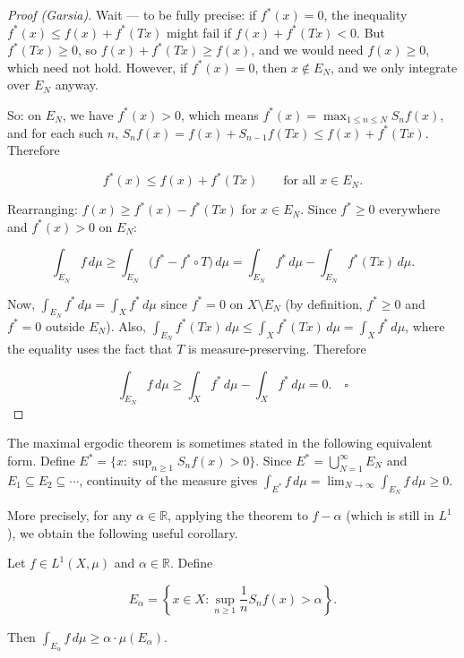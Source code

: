 \begin{proof}[Proof (Garsia)]
Wait --- to be fully precise: if $f^*(x) = 0$, the inequality $f^*(x) \leq f(x) + f^*(Tx)$ might fail if $f(x) + f^*(Tx) < 0$. But $f^*(Tx) \geq 0$, so $f(x) + f^*(Tx) \geq f(x)$, and we would need $f(x) \geq 0$, which need not hold. However, if $f^*(x) = 0$, then $x \notin E_N$, and we only integrate over $E_N$ anyway.

So: on $E_N$, we have $f^*(x) > 0$, which means $f^*(x) = \max_{1 \leq n \leq N} S_n f(x)$, and for each such $n$, $S_n f(x) = f(x) + S_{n-1}f(Tx) \leq f(x) + f^*(Tx)$. Therefore

\[
f^*(x) \leq f(x) + f^*(Tx) \qquad \text{for all } x \in E_N.
\]

Rearranging: $f(x) \geq f^*(x) - f^*(Tx)$ for $x \in E_N$. Since $f^* \geq 0$ everywhere and $f^*(x) > 0$ on $E_N$:

\[
\int_{E_N} f \, d\mu \geq \int_{E_N} \big(f^* - f^* \circ T\big) \, d\mu = \int_{E_N} f^* \, d\mu - \int_{E_N} f^*(Tx) \, d\mu.
\]

Now, $\int_{E_N} f^* \, d\mu = \int_X f^* \, d\mu$ since $f^* = 0$ on $X \setminus E_N$ (by definition, $f^* \geq 0$ and $f^* = 0$ outside $E_N$). Also, $\int_{E_N} f^*(Tx) \, d\mu \leq \int_X f^*(Tx) \, d\mu = \int_X f^* \, d\mu$, where the equality uses the fact that $T$ is measure-preserving. Therefore

\[
\int_{E_N} f \, d\mu \geq \int_X f^* \, d\mu - \int_X f^* \, d\mu = 0. \quad \square
\]

\end{proof}

\begin{remark}
The maximal ergodic theorem is sometimes stated in the following equivalent form. Define $E^* = \{x : \sup_{n \geq 1} S_n f(x) > 0\}$. Since $E^* = \bigcup_{N=1}^\infty E_N$ and $E_1 \subseteq E_2 \subseteq \cdots$, continuity of the measure gives $\int_{E^*} f \, d\mu = \lim_{N \to \infty} \int_{E_N} f \, d\mu \geq 0$.

More precisely, for any $\alpha \in \mathbb{R}$, applying the theorem to $f - \alpha$ (which is still in $L^1$), we obtain the following useful corollary.
\end{remark}


\begin{corollary}\label{cor:9.7}
Let $f \in L^1(X, \mu)$ and $\alpha \in \mathbb{R}$. Define

\[
E_\alpha = \left\{ x \in X : \sup_{n \geq 1} \frac{1}{n} S_n f(x) > \alpha \right\}.
\]

Then $\int_{E_\alpha} f \, d\mu \geq \alpha \cdot \mu(E_\alpha)$.
\end{corollary}



